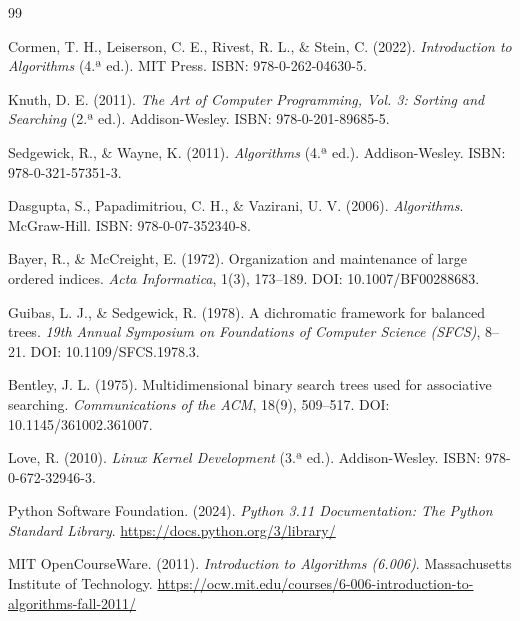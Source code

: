 \documentclass{article}
\begin{document}
\begin{thebibliography}{99}

Cormen, T. H., Leiserson, C. E., Rivest, R. L., \& Stein, C. (2022).
\textit{Introduction to Algorithms} (4.ª ed.). MIT Press.
ISBN: 978-0-262-04630-5.

Knuth, D. E. (2011).
\textit{The Art of Computer Programming, Vol. 3: Sorting and Searching} (2.ª ed.).
Addison-Wesley. ISBN: 978-0-201-89685-5.

Sedgewick, R., \& Wayne, K. (2011).
\textit{Algorithms} (4.ª ed.).
Addison-Wesley. ISBN: 978-0-321-57351-3.

Dasgupta, S., Papadimitriou, C. H., \& Vazirani, U. V. (2006).
\textit{Algorithms}. McGraw-Hill.
ISBN: 978-0-07-352340-8.

Bayer, R., \& McCreight, E. (1972).
Organization and maintenance of large ordered indices.
\textit{Acta Informatica}, 1(3), 173--189.
DOI: 10.1007/BF00288683.

Guibas, L. J., \& Sedgewick, R. (1978).
A dichromatic framework for balanced trees.
\textit{19th Annual Symposium on Foundations of Computer Science (SFCS)}, 8--21.
DOI: 10.1109/SFCS.1978.3.

Bentley, J. L. (1975).
Multidimensional binary search trees used for associative searching.
\textit{Communications of the ACM}, 18(9), 509--517.
DOI: 10.1145/361002.361007.

Love, R. (2010).
\textit{Linux Kernel Development} (3.ª ed.).
Addison-Wesley. ISBN: 978-0-672-32946-3.

Python Software Foundation. (2024).
\textit{Python 3.11 Documentation: The Python Standard Library}.
\url{https://docs.python.org/3/library/}

MIT OpenCourseWare. (2011).
\textit{Introduction to Algorithms (6.006)}.
Massachusetts Institute of Technology.
\url{https://ocw.mit.edu/courses/6-006-introduction-to-algorithms-fall-2011/}

\end{thebibliography}
\end{document}
